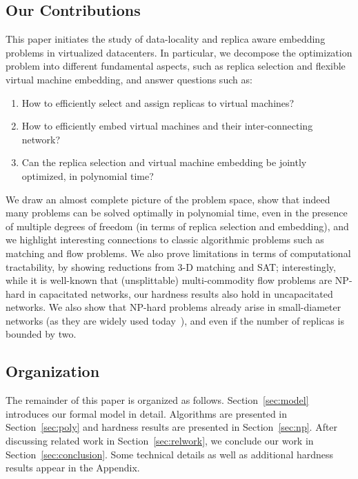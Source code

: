 \documentclass[9pt,twocolumn]{scrartcl}
\begin{document}
\subsection{Our Contributions}

This paper initiates the study of data-locality and replica aware embedding problems in virtualized datacenters.
In particular, we decompose the optimization problem into different fundamental aspects, such as
replica selection and flexible virtual machine embedding, and answer questions such as:
\begin{enumerate}
\item How to efficiently select and assign replicas to virtual machines?

\item How to efficiently embed virtual machines and their inter-connecting network?

\item Can the replica selection and virtual machine embedding be jointly optimized, in polynomial time?
\end{enumerate}

We draw an almost complete picture of the problem space, show that indeed many problems
can be solved optimally in polynomial time, even in the presence of multiple degrees of freedom (in terms of
replica selection and embedding), and
we highlight interesting connections to classic algorithmic
problems such as matching and flow problems.
We also prove limitations in terms of
computational tractability, by showing reductions from 3-D matching and SAT; interestingly,
while it is well-known that (unsplittable) multi-commodity flow
problems are NP-hard in capacitated networks, our hardness results also hold in uncapacitated
networks. We also show that NP-hard problems already arise in small-diameter networks (as they are
widely used today~\cite{fattree}),
and even if the number of replicas is bounded by two.


\subsection{Organization}

The remainder of this paper is organized as follows.
Section~\ref{sec:model} introduces our formal model in detail.
Algorithms are presented in Section~\ref{sec:poly} and
hardness results are presented in Section~\ref{sec:np}.
After discussing related work in Section~\ref{sec:relwork},
we conclude our work in Section~\ref{sec:conclusion}.
Some technical details as well as additional hardness results
appear in the Appendix.
\end{document}
